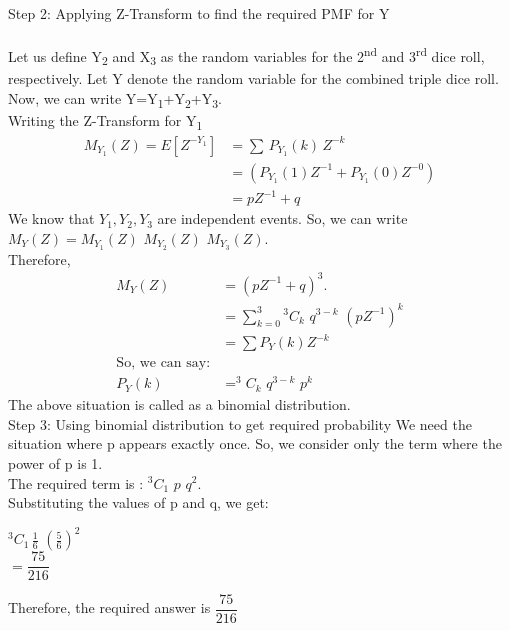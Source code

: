 \documentclass{article}
\begin{document}
    \noindent Step 2: Applying Z-Transform to find the required PMF for Y \\\\
    Let us define Y\textsubscript{2} and X\textsubscript{3} as the random variables for the 2\textsuperscript{nd} and 3\textsuperscript{rd} dice roll, respectively. Let Y denote the random variable for the combined triple dice roll.\medskip\\
    Now, we can write Y=Y\textsubscript{1}+Y\textsubscript{2}+Y\textsubscript{3}.\medskip\\
    Writing the Z-Transform for Y\textsubscript{1}\\
        \begin{align*}
        M_{Y_1}(Z)=E[Z^{-Y_1}]&=\sum\, P_{Y_1}(k)\,Z^{-k}\tag{1}\\
                           &=(P_{Y_1}(1)Z^{-1} +P_{Y_1}(0)Z^{-0})\\
                           &=pZ^{-1}+q\tag{2}
        \end{align*}
    We know that $Y_1,Y_2,Y_3$ are independent events. So, we can write $M_Y(Z)=M_{Y_1}(Z)\,\, M_{Y_2}(Z)\,\,M_{Y_3}(Z)$.\\
    Therefore, 
    \begin{align*}
        M_Y(Z)&=(pZ^{-1}+q)^3\tag{From 2}.\\
              &=\sum_{k=0}^3{^3}C_k\,\,q^{3-k}\,\, (pZ^{-1})^k\\    
              &=\sum P_Y(k)Z^{-k}\tag{From 1}\\
        \text{So, we can say:}\\
            P_Y(k)&=^3C_k\,\,q^{3-k}\,\,p^k\tag{3}
    \end{align*}
    The above situation is called as a binomial distribution.\\
    \noindent Step 3: Using binomial distribution to get required probability
    We need the situation where p appears exactly once. So, we consider only the term where the power of p is 1.\\
    The required term is :  $^3C_1\,\,p\,\,q^2$.\\
    Substituting the values of p and q, we get:\\
    \begin{center}
        $^3C_1\,\frac{1}{6}\,\,\left(\frac{5}{6}\right)^2$\medskip\\
        $=\dfrac{75}{216}$
    \end{center}
    Therefore, the required answer is $\dfrac{75}{216}$\medskip\\
\end{document}
